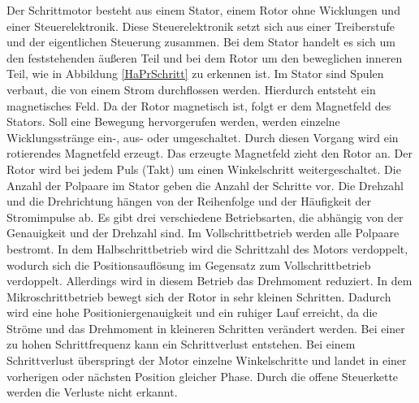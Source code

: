 Der Schrittmotor besteht aus einem Stator, einem Rotor ohne Wicklungen und einer Steuerelektronik. Diese Steuerelektronik setzt sich aus einer Treiberstufe und der eigentlichen Steuerung zusammen. Bei dem Stator handelt es sich um den feststehenden äußeren Teil und bei dem Rotor um den beweglichen inneren Teil, wie in Abbildung \ref{HaPrSchritt} zu erkennen ist. Im Stator sind Spulen verbaut, die von einem Strom durchflossen werden. Hierdurch entsteht ein magnetisches Feld. Da der Rotor magnetisch ist, folgt er dem Magnetfeld des Stators. Soll eine Bewegung hervorgerufen werden, werden einzelne Wicklungsstränge ein-, aus- oder umgeschaltet. Durch diesen Vorgang wird ein rotierendes Magnetfeld erzeugt. Das erzeugte Magnetfeld zieht den Rotor an. Der Rotor wird bei jedem Puls (Takt) um einen Winkelschritt weitergeschaltet. Die Anzahl der Polpaare im Stator geben die Anzahl der Schritte vor. Die Drehzahl und die Drehrichtung hängen von der Reihenfolge und der Häufigkeit der Stromimpulse ab. Es gibt drei verschiedene Betriebsarten, die abhängig von der Genauigkeit und der Drehzahl sind. Im Vollschrittbetrieb werden alle Polpaare bestromt. In dem Halbschrittbetrieb wird die Schrittzahl des Motors verdoppelt, wodurch sich die Positionsauflösung im Gegensatz zum Vollschrittbetrieb verdoppelt. Allerdings wird in diesem Betrieb das Drehmoment reduziert. In dem Mikroschrittbetrieb bewegt sich der Rotor in sehr kleinen Schritten. Dadurch wird eine hohe Positioniergenauigkeit und ein ruhiger Lauf erreicht, da die Ströme und das Drehmoment in kleineren Schritten verändert werden. Bei einer zu hohen Schrittfrequenz kann ein Schrittverlust entstehen. Bei einem Schrittverlust überspringt der Motor einzelne Winkelschritte und landet in einer vorherigen oder nächsten Position gleicher Phase. Durch die offene Steuerkette werden die Verluste nicht erkannt.    \cite{Hagl.2021}\cite{Bernstein.2018}\cite{Schroder.2021}

